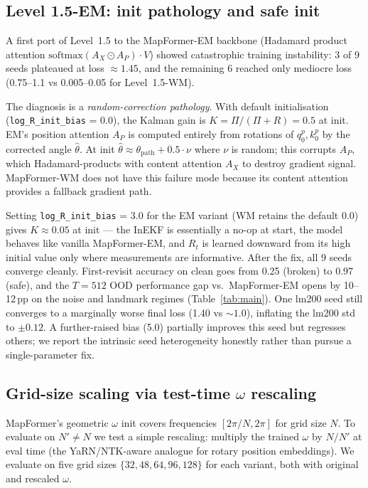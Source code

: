 \subsection{Level 1.5-EM: init pathology and safe init}

A first port of Level~1.5 to the MapFormer-EM backbone (Hadamard product
attention $\mathrm{softmax}(A_X \odot A_P) \cdot V$) showed catastrophic
training instability: 3 of 9 seeds plateaued at loss $\approx 1.45$, and
the remaining 6 reached only mediocre loss (0.75--1.1 vs 0.005--0.05
for Level~1.5-WM).

The diagnosis is a \emph{random-correction pathology}. With default
initialisation (\texttt{log\_R\_init\_bias} = 0.0), the Kalman gain is
$K = \Pi/(\Pi+R) = 0.5$ at init. EM's position attention $A_P$ is
computed entirely from rotations of $q_0^p, k_0^p$ by the corrected
angle $\hat\theta$. At init $\hat\theta \approx \theta_\mathrm{path} +
0.5 \cdot \nu$ where $\nu$ is random; this corrupts $A_P$, which
Hadamard-products with content attention $A_X$ to destroy gradient
signal. MapFormer-WM does not have this failure mode because its
content attention provides a fallback gradient path.

Setting \texttt{log\_R\_init\_bias} = 3.0 for the EM variant (WM
retains the default 0.0) gives $K \approx 0.05$ at init --- the InEKF is
essentially a no-op at start, the model behaves like vanilla
MapFormer-EM, and $R_t$ is learned downward from its high initial value
only where measurements are informative. After the fix, all 9 seeds
converge cleanly. First-revisit accuracy on clean goes from 0.25
(broken) to 0.97 (safe), and the $T{=}512$ OOD performance gap vs.\
MapFormer-EM opens by 10--12\,pp on the noise and landmark regimes
(Table~\ref{tab:main}). One lm200 seed still converges to a marginally
worse final loss (1.40 vs $\sim 1.0$), inflating the lm200 std to
$\pm 0.12$. A further-raised bias (5.0) partially improves this seed
but regresses others; we report the intrinsic seed heterogeneity
honestly rather than pursue a single-parameter fix.

\subsection{Grid-size scaling via test-time $\omega$ rescaling}

MapFormer's geometric $\omega$ init covers frequencies $[2\pi/N, 2\pi]$
for grid size $N$. To evaluate on $N' \neq N$ we test a simple
rescaling: multiply the trained $\omega$ by $N/N'$ at eval time (the
YaRN/NTK-aware analogue for rotary position embeddings). We evaluate on
five grid sizes $\{32, 48, 64, 96, 128\}$ for each variant, both with
original and rescaled $\omega$.

